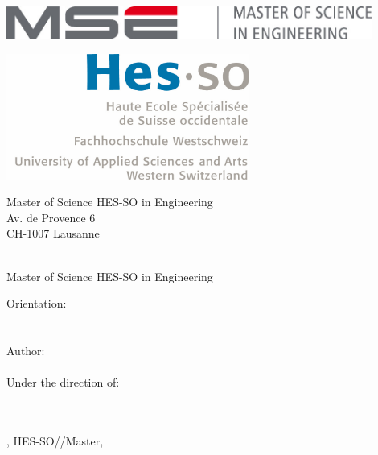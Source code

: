 
\begin{titlepage}
{\selectfont
	\begin{flushright}
		\begin{minipage}{0.5\textwidth}
			\begin{flushleft}
				\includegraphics[width=0.9\textwidth]{img/mse_logo}
			\end{flushleft}
		\end{minipage}%
		\begin{minipage}{0.5\textwidth}
			\begin{flushright}
				\includegraphics[width=0.6\textwidth]{img/hesso_logo}
			\end{flushright}
		\end{minipage}
		\begin{flushleft}
			\footnotesize
			Master of Science HES-SO in Engineering \\
			Av. de Provence 6 \\
			CH-1007 Lausanne
		\end{flushleft}
		~\\[0.5cm]

		{
		\Huge Master of Science HES-SO in Engineering\\[0.5cm]
		}

		{
		\LARGE Orientation: \Orientation\\[0.5cm]
		~\\[1cm]
		}
		{
			\Huge
			\ThesisTitle \\[1.5cm]
		}
		{
			\large
			Author:\\[-0.3cm]
			\Huge \Author \\[0.8cm]
		}
		{
			\large
			Under the direction of:\\
			\Advisor \\
			\AdvisorResearchUnit \\[0.5cm]
		}
		\vfill

		{\large \Place, HES-SO//Master, \Date}

	\end{flushright}
}
\restoregeometry
\end{titlepage}
